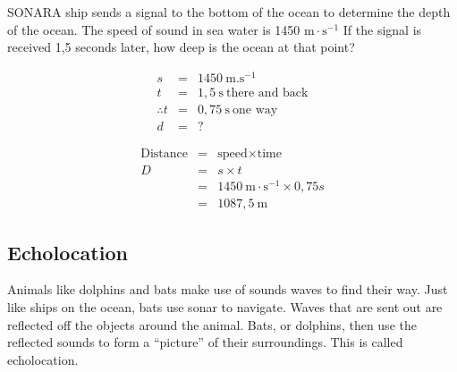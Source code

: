 \begin{wex}{SONAR}{A ship sends a signal to the bottom of the ocean to determine the depth of the ocean. The speed of sound in sea water is 1450 $\text{m}\cdot\text{s}^{-1}$ If the signal is received 1,5 seconds later, how deep is the ocean at that point?}{
\begin{eqnarray*}
s &=& 1450 \ \text{m}.\text{s}^{-1}\\
t &=& 1,5 \ \text{s} \ \text{there \ and \ back}\\
\therefore t &= & 0,75 \ \text{s} \ \text{one \ way}\\
d &=& ?
\end{eqnarray*}

\begin{eqnarray*}
\text{Distance} &=& \text{speed} \times \text{time} \\
D &=& s \times t \\
&=& 1450~\text{m}\cdot\text{s}^{-1} \times 0,75 s \\
&=& 1087,5 \ \text{m}
\end{eqnarray*}
}\end{wex}
\vspace{-1cm} 
\subsection{Echolocation}
            \nopagebreak
        \label{m38800*id185251}Animals like dolphins and bats make use of sounds waves to find their way. Just like ships on the ocean, bats use sonar to navigate. Waves that are sent out are reflected off the objects around the animal. Bats, or dolphins, then use the reflected sounds to form a ``picture'' of their surroundings. This is called echolocation.

